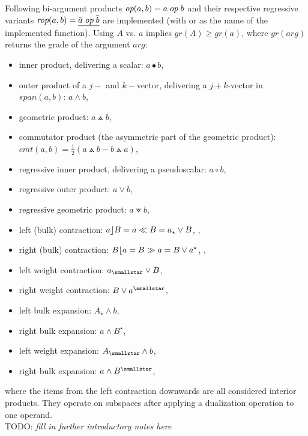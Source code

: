 Following bi-argument products $\emph{op}(a,b) = a \; op \; b$ and their respective
regressive variants $\emph{rop}(a,b) = \underline{\bar{a} \; \emph{op} \; \bar{b}}$ are
implemented (with  or  as the name of the implemented
function). Using $A$ vs. $a$ implies $gr(A) \ge gr(a)$, where $gr(arg)$ returns the grade
of the argument $arg$:
\begin{itemize}
    \item inner product, delivering a scalar: $a \bullet b$, 
    \item outer product of a $j-$ and $k-$vector, delivering a $j+k$-vector in
    $span(a,b)$: $a \wedge b$, 
    \item geometric product:  $a \wedgedot b$, 
    \item commutator product (the asymmetric part of the geometric product): $cmt(a,b) =
    \frac{1}{2}(a \wedgedot b - b \wedgedot a)$,
    \item regressive inner product, delivering a pseudoscalar: $a \circ b$,
    \item regressive outer product: $a \vee b$, 
    \item regressive geometric product: $a \veedot b$, 
    
    \item left (bulk) contraction: $a \rfloor B = a \ll B = a_{\star} \vee B $,
    ,   
    \item right (bulk) contraction: $B \lfloor a = B \gg a = B \vee a^{\star} $,
    , 

    \item left weight contraction: $a_{\smallstar} \vee B $,
    \item right weight contraction: $B \vee a^{\smallstar} $,

    \item left bulk expansion: $A_{\star} \wedge b $,
    \item right bulk expansion: $a \wedge B^{\star} $,

    \item left weight expansion: $A_{\smallstar} \wedge b $,
    \item right bulk expansion: $a \wedge B^{\smallstar} $,
\end{itemize}
where the items from the left contraction downwards are all considered interior products.
They operate on subspaces after applying a dualization operation to one operand. \\


TODO: \emph{fill in further introductory notes here} \\

\newpage
